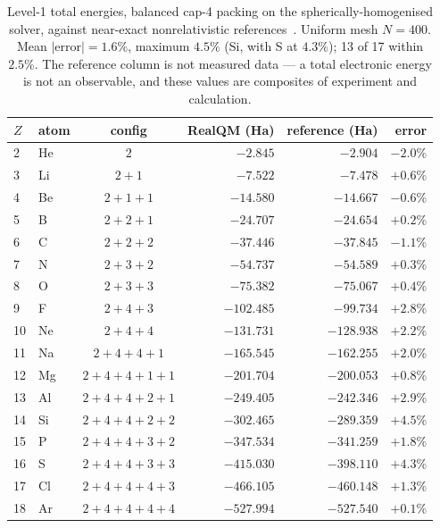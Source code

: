 \begin{table}[h]
\centering
\small
\renewcommand{\arraystretch}{1.08}
\caption{Level-1 total energies, balanced cap-4 packing on the spherically-homogenised solver,
against near-exact nonrelativistic references~\cite{Chakravorty}. Uniform mesh $N=400$.
Mean $|\text{error}| = 1.6\%$, maximum $4.5\%$ (Si, with S at $4.3\%$); 13 of 17 within $2.5\%$.
The reference column is not measured data --- a total electronic energy is not an observable, and
these values are composites of experiment and calculation.}\label{tab:atoms}
\begin{tabular}{llcrrr}
\toprule
$Z$ & atom & config & RealQM (Ha) & reference (Ha) & error \\
\midrule
2  & He & $2$                 & $-2.845$   & $-2.904$   & $-2.0\%$ \\
3  & Li & $2{+}1$             & $-7.522$   & $-7.478$   & $+0.6\%$ \\
4  & Be & $2{+}1{+}1$         & $-14.580$  & $-14.667$  & $-0.6\%$ \\
5  & B  & $2{+}2{+}1$         & $-24.707$  & $-24.654$  & $+0.2\%$ \\
6  & C  & $2{+}2{+}2$         & $-37.446$  & $-37.845$  & $-1.1\%$ \\
7  & N  & $2{+}3{+}2$         & $-54.737$  & $-54.589$  & $+0.3\%$ \\
8  & O  & $2{+}3{+}3$         & $-75.382$  & $-75.067$  & $+0.4\%$ \\
9  & F  & $2{+}4{+}3$         & $-102.485$ & $-99.734$  & $+2.8\%$ \\
10 & Ne & $2{+}4{+}4$         & $-131.731$ & $-128.938$ & $+2.2\%$ \\
11 & Na & $2{+}4{+}4{+}1$     & $-165.545$ & $-162.255$ & $+2.0\%$ \\
12 & Mg & $2{+}4{+}4{+}1{+}1$ & $-201.704$ & $-200.053$ & $+0.8\%$ \\
13 & Al & $2{+}4{+}4{+}2{+}1$ & $-249.405$ & $-242.346$ & $+2.9\%$ \\
14 & Si & $2{+}4{+}4{+}2{+}2$ & $-302.465$ & $-289.359$ & $+4.5\%$ \\
15 & P  & $2{+}4{+}4{+}3{+}2$ & $-347.534$ & $-341.259$ & $+1.8\%$ \\
16 & S  & $2{+}4{+}4{+}3{+}3$ & $-415.030$ & $-398.110$ & $+4.3\%$ \\
17 & Cl & $2{+}4{+}4{+}4{+}3$ & $-466.105$ & $-460.148$ & $+1.3\%$ \\
18 & Ar & $2{+}4{+}4{+}4{+}4$ & $-527.994$ & $-527.540$ & $+0.1\%$ \\
\bottomrule
\end{tabular}
\end{table}

